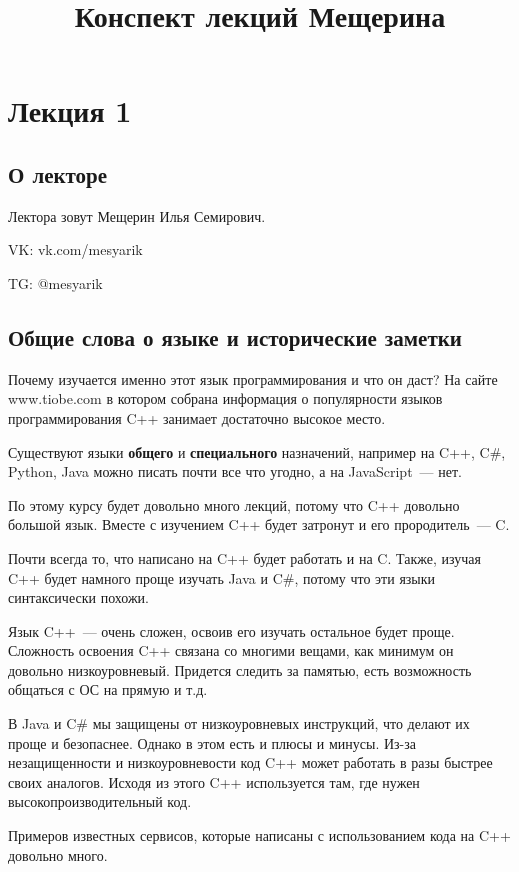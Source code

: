 \documentclass{article}
\title{Конспект лекций Мещерина}
\date{}
\author{}
\begin{document}
\maketitle
\tableofcontents

\section{Лекция 1}

\subsection*{О лекторе}
Лектора зовут Мещерин Илья Семирович.

VK: vk.com/mesyarik

TG: @mesyarik

\subsection{Общие слова о языке и исторические заметки}
Почему изучается именно этот язык программирования и что он даст?
На сайте www.tiobe.com в котором собрана информация о популярности языков программирования C++ занимает достаточно высокое место.

Существуют языки \textbf{общего} и \textbf{специального} назначений,
например на C++, C\#, Python, Java можно писать почти все что угодно, а на JavaScript~--- нет.

По этому курсу будет довольно много лекций, потому что C++ довольно большой язык.
Вместе с изучением C++ будет затронут и его прородитель~--- C.

Почти всегда то, что написано на C++ будет работать и на C.
Также, изучая C++ будет намного проще изучать Java и C\#, потому что эти языки синтаксически похожи.

Язык C++~--- очень сложен, освоив его изучать остальное будет проще.
Сложность освоения C++ связана со многими вещами, как минимум он довольно низкоуровневый.
Придется следить за памятью, есть возможность общаться с ОС на прямую и т.д.

В Java и C\# мы защищены от низкоуровневых инструкций, что делают их проще и безопаснее.
Однако в этом есть и плюсы и минусы. Из-за незащищенности и низкоуровневости код C++ может работать в разы быстрее своих аналогов.
Исходя из этого C++ используется там, где нужен высокопроизводительный код.

Примеров известных сервисов, которые написаны с использованием кода на C++ довольно много.
\end{document}
